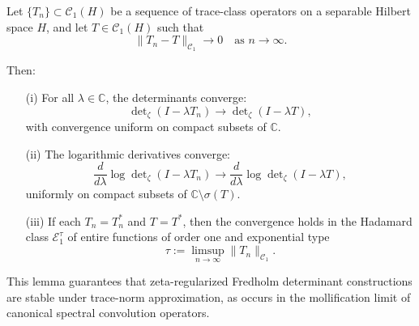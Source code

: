 \begin{lemma}
\label{lem:det_continuity_trace_norm}
Let \( \{ T_n \} \subset \mathcal{C}_1(H) \) be a sequence of trace-class operators on a separable Hilbert space \( H \), and let \( T \in \mathcal{C}_1(H) \) such that
\[
\| T_n - T \|_{\mathcal{C}_1} \to 0 \quad \text{as } n \to \infty.
\]

Then:
\begin{enumerate}
  \item[\textnormal{(i)}] For all \( \lambda \in \mathbb{C} \), the determinants converge:
  \[
  \det\nolimits_\zeta(I - \lambda T_n) \to \det\nolimits_\zeta(I - \lambda T),
  \]
  with convergence uniform on compact subsets of \( \mathbb{C} \).

  \item[\textnormal{(ii)}] The logarithmic derivatives converge:
  \[
  \frac{d}{d\lambda} \log \det\nolimits_\zeta(I - \lambda T_n)
  \to \frac{d}{d\lambda} \log \det\nolimits_\zeta(I - \lambda T),
  \]
  uniformly on compact subsets of \( \mathbb{C} \setminus \sigma(T) \).

  \item[\textnormal{(iii)}] If each \( T_n = T_n^* \) and \( T = T^* \), then the convergence holds in the Hadamard class \( \mathcal{E}_1^\tau \) of entire functions of order one and exponential type
  \[
  \tau := \limsup_{n \to \infty} \| T_n \|_{\mathcal{C}_1}.
  \]
\end{enumerate}

\medskip
\noindent
This lemma guarantees that zeta-regularized Fredholm determinant constructions are stable under trace-norm approximation, as occurs in the mollification limit of canonical spectral convolution operators.
\end{lemma}
